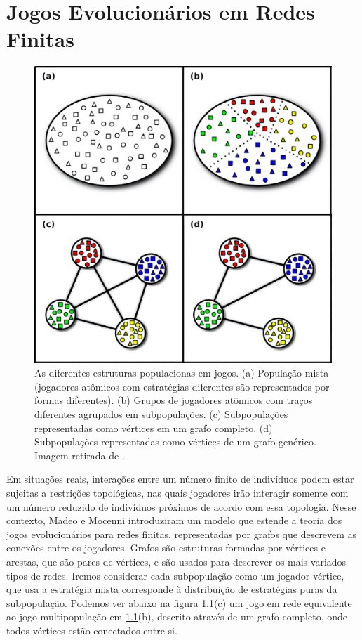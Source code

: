 \chapter{Jogos Evolucionários em Redes Finitas}

\begin{figure}[h]
    \caption{As diferentes estruturas populacionas em jogos. (a) População mista (jogadores atômicos com estratégias diferentes são representados por formas diferentes). (b) Grupos de jogadores atômicos com traços diferentes agrupados em subpopulações. (c) Subpopulações representadas como vértices em um grafo completo. (d) Subpopulações representadas como vértices de um grafo genérico. Imagem retirada de \cite{madeo2015}.}
    \centerline{\includegraphics[scale=0.22]{./img/dif_populacao.jpg}}
    \label{fig:dif_populacao}
\end{figure}

Em situações reais, interações entre um número finito de indivíduos podem estar sujeitas a restrições topológicas, nas quais jogadores irão interagir somente com um número reduzido de indivíduos próximos de acordo com essa topologia. Nesse contexto, Madeo e Mocenni \cite{madeo2015} introduziram um modelo que estende a teoria dos jogos evolucionários para redes finitas, representadas por grafos que descrevem as conexões entre os jogadores. Grafos são estruturas formadas por vértices e arestas, que são pares de vértices, e são usados para descrever os mais variados tipos de redes. Iremos considerar cada subpopulação como um jogador vértice, que usa a estratégia mista corresponde à distribuição de estratégias puras da subpopulação. Podemos ver abaixo na figura \ref{fig:dif_populacao}(c) um jogo em rede equivalente ao jogo multipopulação em \ref{fig:dif_populacao}(b), descrito através de um grafo completo, onde todos vértices estão conectados entre si.

